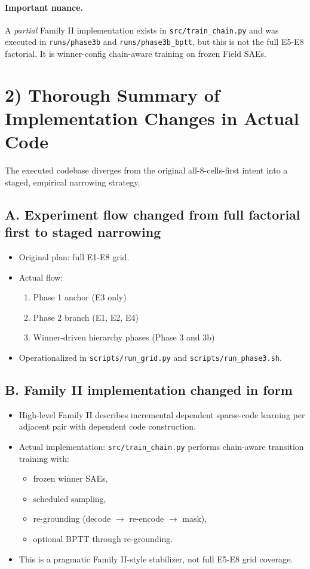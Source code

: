 \documentclass[11pt]{article}
\begin{document}
\paragraph{Important nuance.}
A \emph{partial} Family II implementation exists in \texttt{src/train\_chain.py} and was executed in \texttt{runs/phase3b} and \texttt{runs/phase3b\_bptt}, but this is not the full E5-E8 factorial. It is winner-config chain-aware training on frozen Field SAEs.

\section{2) Thorough Summary of Implementation Changes in Actual Code}
The executed codebase diverges from the original all-8-cells-first intent into a staged, empirical narrowing strategy.

\subsection{A. Experiment flow changed from full factorial first to staged narrowing}
\begin{itemize}[leftmargin=*]
    \item Original plan: full E1-E8 grid.
    \item Actual flow:
    \begin{enumerate}[leftmargin=*]
        \item Phase 1 anchor (E3 only)
        \item Phase 2 branch (E1, E2, E4)
        \item Winner-driven hierarchy phases (Phase 3 and 3b)
    \end{enumerate}
    \item Operationalized in \texttt{scripts/run\_grid.py} and \texttt{scripts/run\_phase3.sh}.
\end{itemize}

\subsection{B. Family II implementation changed in form}
\begin{itemize}[leftmargin=*]
    \item High-level Family II describes incremental dependent sparse-code learning per adjacent pair with dependent code construction.
    \item Actual implementation: \texttt{src/train\_chain.py} performs chain-aware transition training with:
    \begin{itemize}[leftmargin=*]
        \item frozen winner SAEs,
        \item scheduled sampling,
        \item re-grounding (decode $\rightarrow$ re-encode $\rightarrow$ mask),
        \item optional BPTT through re-grounding.
    \end{itemize}
    \item This is a pragmatic Family II-style stabilizer, not full E5-E8 grid coverage.
\end{itemize}
\end{document}
